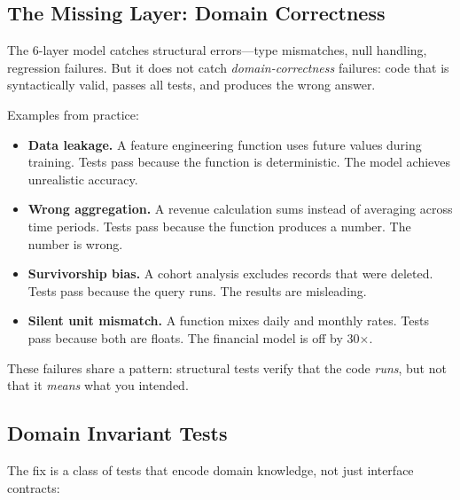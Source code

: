 
\subsection{The Missing Layer: Domain Correctness}
\label{subsec:domain-correctness}


The 6-layer model catches structural errors---type mismatches,
null handling, regression failures. But it does not catch
\emph{domain-correctness} failures: code that is syntactically
valid, passes all tests, and produces the wrong answer.

Examples from practice:

\begin{itemize}
  \item \textbf{Data leakage.} A feature engineering function uses
    future values during training. Tests pass because the function
    is deterministic. The model achieves unrealistic accuracy.
  \item \textbf{Wrong aggregation.} A revenue calculation sums
    instead of averaging across time periods. Tests pass because
    the function produces a number. The number is wrong.
  \item \textbf{Survivorship bias.} A cohort analysis excludes
    records that were deleted. Tests pass because the query runs.
    The results are misleading.
  \item \textbf{Silent unit mismatch.} A function mixes daily and
    monthly rates. Tests pass because both are floats.
    The financial model is off by 30$\times$.
\end{itemize}

\noindent These failures share a pattern: structural tests verify that
the code \emph{runs}, but not that it \emph{means} what you intended.

\subsection*{Domain Invariant Tests}

The fix is a class of tests that encode domain knowledge,
not just interface contracts:

